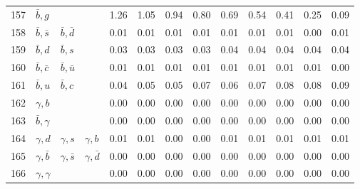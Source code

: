 \begin{tabularx}{\textwidth}{rXXX@{}S@{}S@{}S@{}S@{}S@{}S@{}S@{}S@{}S}
157 & $\bar b, g$      &                   &                  &  1.26 &  1.05 &  0.94 &  0.80 &  0.69 &  0.54 &  0.41 &  0.25 &  0.09 \\
158 & $\bar b, \bar s$ & $\bar b, \bar d$  &                  &  0.01 &  0.01 &  0.01 &  0.01 &  0.01 &  0.01 &  0.01 &  0.00 &  0.01 \\
159 & $\bar b, d$      & $\bar b, s$       &                  &  0.03 &  0.03 &  0.03 &  0.03 &  0.04 &  0.04 &  0.04 &  0.04 &  0.04 \\
160 & $\bar b, \bar c$ & $\bar b, \bar u$  &                  &  0.01 &  0.01 &  0.01 &  0.01 &  0.01 &  0.01 &  0.01 &  0.01 &  0.00 \\
161 & $\bar b, u$      & $\bar b, c$       &                  &  0.04 &  0.05 &  0.05 &  0.07 &  0.06 &  0.07 &  0.08 &  0.08 &  0.09 \\
162 & $\gamma, b$      &                   &                  &  0.00 &  0.00 &  0.00 &  0.00 &  0.00 &  0.00 &  0.00 &  0.00 &  0.00 \\
163 & $\bar b, \gamma$ &                   &                  &  0.00 &  0.00 &  0.00 &  0.00 &  0.00 &  0.00 &  0.00 &  0.00 &  0.00 \\
164 & $\gamma,  d$     & $\gamma, s$       & $\gamma, b$      &  0.01 &  0.01 &  0.00 &  0.00 &  0.01 &  0.01 &  0.01 &  0.01 &  0.01 \\
165 & $\gamma, \bar b$ & $\gamma, \bar s$  & $\gamma, \bar d$ &  0.00 &  0.00 &  0.00 &  0.00 &  0.00 &  0.00 &  0.00 &  0.00 &  0.00 \\
166 & $\gamma, \gamma$ &                   &                  &  0.00 &  0.00 &  0.00 &  0.00 &  0.00 &  0.00 &  0.00 &  0.00 &  0.00 \\
\bottomrule
\end{tabularx}
